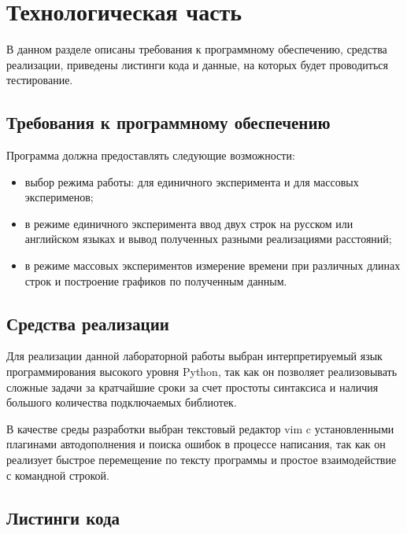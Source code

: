 \chapter{Технологическая часть}

В данном разделе описаны требования к программному обеспечению, средства реализации, приведены листинги кода и данные, на которых будет проводиться тестирование.

\section{Требования к программному обеспечению}

Программа должна предоставлять следующие возможности:
\begin{itemize}[left=\parindent]
    \item выбор режима работы: для единичного эксперимента и для массовых
          эксперименов;
    \item в режиме единичного эксперимента ввод двух строк на русском или
          английском языках и вывод полученных разными реализациями расстояний;
    \item в режиме массовых экспериментов измерение времени при различных
          длинах строк и построение графиков по полученным данным.
\end{itemize}

\section{Средства реализации}


Для реализации данной лабораторной работы выбран интерпретируемый язык
программирования высокого уровня Python, так как он позволяет реализовывать
сложные задачи за кратчайшие сроки за счет простоты синтаксиса и наличия
большого количества подключаемых библиотек. 

В качестве среды разработки выбран текстовый редактор vim c установленными
плагинами автодополнения и поиска ошибок в процессе написания, так как он
реализует быстрое перемещение по тексту программы и простое взаимодействие с
командной строкой.

\section{Листинги кода}

